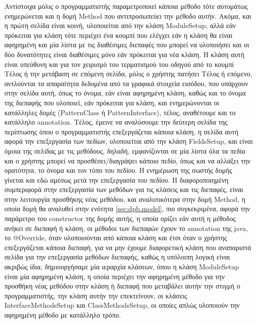 Αντίστοιχα μόλις ο προγραμματιστής παραμετροποιεί κάποια μέθοδο τότε αυτομάτως ενημερώνεται και η δομή Method που αντιπροσωπεύει την μέθοδο αυτήν.
Ακόμα, και η πρώτη σελίδα είναι κοινή, υλοποιείται από την κλάση ModuleSetup, αλλά εάν πρόκειται για κλάση τότε περιέχει 
ένα κουμπί που ελέγχει εάν η κλάση θα είναι αφηρημένη και μία λίστα με τις διαθέσιμες διεπαφές που μπορεί να υλοποιήσει και οι δύο δυνατότητες 
είναι διαθέσιμες μόνο εάν πρόκειται για νέα κλάση. 
Η κλάση αυτή είναι υπεύθυνη και για τον χειρισμό του τερματισμού του οδηγού από το κουμπί Τέλος ή την μετάβαση σε επόμενη σελίδα, 
μόλις ο χρήστης πατήσει Τέλος ή επόμενο,  αντλούνται τα απαραίτητα δεδομένα από τα γραφικά στοιχεία εισόδου, 
που υπάρχουν στην σελίδα αυτή, όπως το όνομα, εάν είναι αφηρημένη κλάση, καθώς και το όνομα της διεπαφής που υλοποιεί, 
εάν πρόκειται για κλάση, και ενημερώνονται οι κατάλληλες δομές (PatternClass ή PatternInterface), τέλος, αναθέτουμε και το κατάλληλο annotation. 
Τέλος, έμεινε να αναλύσουμε την δεύτερη σελίδα της περίπτωσης όπου ο προγραμματιστής επεξεργάζεται κάποια κλάση, 
η σελίδα αυτή αφορά την επεξεργασία των πεδίων, υλοποιείται από την κλάση FieldsSetup, και είναι όμοια της σελίδας με τις μεθόδους, 
δηλαδή, εμφανίζονται σε μία λίστα όλα τα πεδία και ο χρήστης μπορεί να προσθέσει/διαγράψει κάποιο πεδίο, όπως και να αλλάξει την ορατότητα,
το όνομα και τον τύπο του πεδίου. Η ενημέρωση της σωστής δομής γίνεται και εδώ αμέσως μετά την επεξεργασία του πεδίου. 
Η διαφοροποιημένη συμπεριφορά στην επεξεργασία των μεθόδων για τις κλάσεις και τις διεπαφές, είναι στην λειτουργία προσθήκης νέας μεθόδου, 
και αναλυτικότερα στην δομή Method, η οποία δομή θα αναλυθεί στην ενότητα \ref{sec:dpb.model}, πιο συγκεκριμένα, 
αφορά  την παράμετρο του constructor της δομής αυτής, η οποία ορίζει εάν αυτή η μέθοδος ανήκει σε διεπαφή ή κλάση, 
οι μέθοδοι των διεπαφών έχουν το annotation της java, το @Override, όταν υλοποιούνται από κάποια κλάση 
και έτσι όταν ο χρήστης επεξεργάζεται κάποια διεπαφή, για να μην έχουμε διαφορετική κλάση που αναπαριστά σελίδα για την επεξεργασία μεθόδων διεπαφής, 
καθώς η υπόλοιπη λογική είναι ακριβώς ίδια, δημιουργήσαμε μία ιεραρχία κλάσεων, όπου η κλάση \mbox{ModuleSetup} είναι μία αφηρημένη κλάση, 
η οποία περιέχει την αφηρημένη μέθοδο για την προσθήκη νέας μεθόδου στην κλάση ή διεπαφή που μεταβάλει αυτήν την στιγμή ο προγραμματιστής, 
την κλάση αυτήν την επεκτείνουν, οι κλάσεις InterfaceMethodsSetup και ClassMethodsSetup, 
οι οποίες απλώς υλοποιούν την αφηρημένη μέθοδο με κατάλληλο τρόπο.
